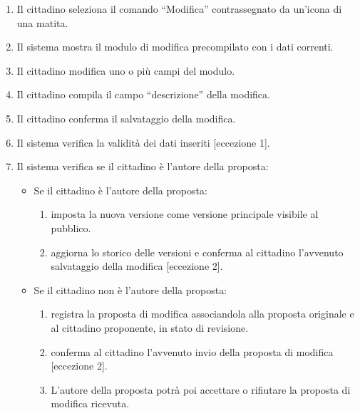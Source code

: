 \begin{ucscope}
\begin{description}
\begin{enumerate}
    \item Il cittadino seleziona il comando ``Modifica'' contrassegnato da un'icona di una matita.

    \item Il sistema mostra il modulo di modifica precompilato con i dati correnti.

    \item Il cittadino modifica uno o più campi del modulo.

    \item Il cittadino compila il campo ``descrizione'' della modifica.

    \item Il cittadino conferma il salvataggio della modifica.

    \item Il sistema verifica la validità dei dati inseriti [eccezione 1].

    \item Il sistema verifica se il cittadino è l’autore della proposta:
    \begin{itemize}
      \item Se il cittadino è l'autore della proposta:
      \begin{enumerate}
        \item imposta la nuova versione come versione principale visibile al pubblico.

        \item aggiorna lo storico delle versioni e conferma al cittadino l’avvenuto salvataggio della modifica [eccezione 2].
      \end{enumerate}

      \item Se il cittadino non è l'autore della proposta:
      \begin{enumerate}
        \item registra la proposta di modifica associandola alla proposta originale e al cittadino proponente, in stato di revisione.

        \item conferma al cittadino l’avvenuto invio della proposta di modifica [eccezione 2].

        \item L’autore della proposta potrà poi accettare o rifiutare la proposta di modifica ricevuta.
      \end{enumerate}
    \end{itemize}
  \end{enumerate}


\end{description}
\end{ucscope}
